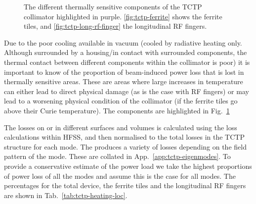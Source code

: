 \begin{figure}
\label{fig:tctp-heat-loc}
\caption{The different thermally sensitive components of the TCTP collimator highlighted in purple. \ref{fig:tctp-ferrite} shows the ferrite tiles, and \ref{fig:tctp-long-rf-finger} the longitudinal RF fingers.}
\end{figure}

Due to the poor cooling available in vacuum (cooled by radiative heating only. Although surrounded by a housing/in contact with surrounded components, the thermal contact between different components within the collimator is poor) it is important to know of the proportion of beam-induced power loss that is lost in thermally sensitive areas. These are areas where large increases in temperature can either lead to direct physical damage (as is the case with RF fingers) or may lead to a worsening physical condition of the collimator (if the ferrite tiles go above their Curie temperature). The components are highlighted in Fig.~\ref{fig:tctp-heat-loc}

The losses on or in different surfaces and volumes is calculated using the loss calculations within HFSS, and then normalised to the total losses in the TCTP structure for each mode. The produces a variety of losses depending on the field pattern of the mode. These are collated in App.~\ref{app:tctp-eigenmodes}. To provide a conservative estimate of the power load we take the highest proportions of power loss of all the modes and assume this is the case for all modes. The percentages for the total device, the ferrite tiles and the longitudinal RF fingers are shown in Tab.~\ref{tab:tctp-heating-loc}. 

